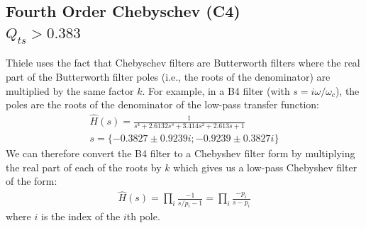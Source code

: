 \documentclass[10pt]{book}
\begin{document}
\subsection{Fourth Order Chebyschev (C4) \texorpdfstring{\\$Q_{ts}>0.383$}{Qts>0.383}}
Thiele uses the fact that Chebyschev filters are Butterworth filters where the real part of the Butterworth filter poles (i.e., the roots of the denominator) are multiplied by the same factor $k$. For example, in a B4 filter (with $s=i\omega/\omega_c$), the poles are the roots of the denominator of the low-pass transfer function:
\begin{align}
\hat{H}(s)=\frac{1}{
s^4+2.6132s^3+3.414s^2+2.613s+1}\\
s=\{-0.3827\pm 0.9239i;-0.9239 \pm 0.3827i\}\label{eq:cheby_roots}
\end{align}
We can therefore convert the B4 filter to a Chebyshev filter form by multiplying the real part of each of the roots by $k$ which gives us a low-pass Chebyshev filter of the form:
\begin{align}
\hat{H}(s)= \prod_i \frac{-1}{ s/p_i-1 }= \prod_i  \frac{-p_i}{ s-p_i }
\end{align}
where $i$ is the index of the $i$th pole.
\end{document}
